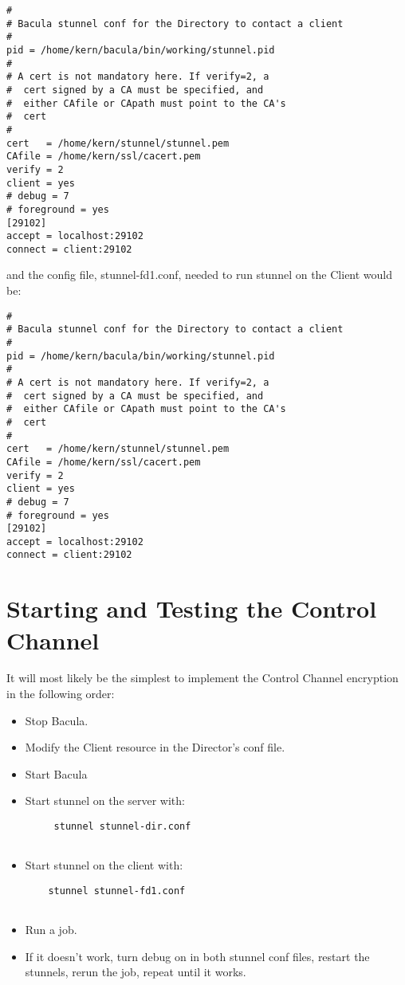\footnotesize
\begin{verbatim}
#
# Bacula stunnel conf for the Directory to contact a client
#
pid = /home/kern/bacula/bin/working/stunnel.pid
#
# A cert is not mandatory here. If verify=2, a
#  cert signed by a CA must be specified, and
#  either CAfile or CApath must point to the CA's
#  cert
#
cert   = /home/kern/stunnel/stunnel.pem
CAfile = /home/kern/ssl/cacert.pem
verify = 2
client = yes
# debug = 7
# foreground = yes
[29102]
accept = localhost:29102
connect = client:29102
\end{verbatim}
\normalsize

and the config file, stunnel-fd1.conf, needed to run stunnel on the Client
would be: 

\footnotesize
\begin{verbatim}
#
# Bacula stunnel conf for the Directory to contact a client
#
pid = /home/kern/bacula/bin/working/stunnel.pid
#
# A cert is not mandatory here. If verify=2, a
#  cert signed by a CA must be specified, and
#  either CAfile or CApath must point to the CA's
#  cert
#
cert   = /home/kern/stunnel/stunnel.pem
CAfile = /home/kern/ssl/cacert.pem
verify = 2
client = yes
# debug = 7
# foreground = yes
[29102]
accept = localhost:29102
connect = client:29102
\end{verbatim}
\normalsize

\section{Starting and Testing the Control Channel}

It will most likely be the simplest to implement the Control Channel
encryption in the following order: 

\begin{itemize}
\item Stop Bacula.  
\item Modify the Client resource in the Director's conf  file.  
\item Start Bacula  
\item Start stunnel on the server with:  

   \footnotesize
\begin{verbatim}
     stunnel stunnel-dir.conf
  
\end{verbatim}
\normalsize

\item Start stunnel on the client with:  

   \footnotesize
\begin{verbatim}
    stunnel stunnel-fd1.conf
  
\end{verbatim}
\normalsize

\item Run a job.  
\item If it doesn't work, turn debug on in both stunnel conf files,  restart
   the stunnels, rerun the job, repeat until it works. 
   \end{itemize}

